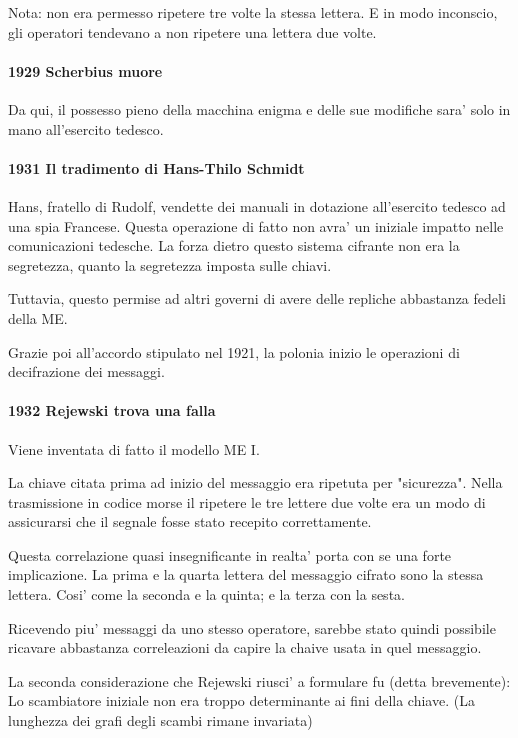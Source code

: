 Nota: non era permesso ripetere tre volte la stessa lettera.
E in modo inconscio, gli operatori tendevano a non ripetere una lettera due volte.

\paragraph{1929 Scherbius muore}
Da qui, il possesso pieno della macchina enigma e delle sue modifiche
sara' solo in mano all'esercito tedesco.

\paragraph{1931 Il tradimento di Hans-Thilo Schmidt}
Hans, fratello di Rudolf, vendette dei manuali in dotazione all'esercito
tedesco ad una spia Francese.
Questa operazione di fatto non avra' un iniziale impatto nelle comunicazioni tedesche.
La forza dietro questo sistema cifrante non era la segretezza, quanto la
segretezza imposta sulle chiavi.

Tuttavia, questo permise ad altri governi di avere delle repliche abbastanza
fedeli della ME.

Grazie poi all'accordo stipulato nel 1921, la polonia inizio le operazioni di
decifrazione dei messaggi.

\paragraph{1932 Rejewski trova una falla}
Viene inventata di fatto il modello ME I.

La chiave citata prima ad inizio del messaggio era ripetuta per "sicurezza".
Nella trasmissione in codice morse il ripetere le tre lettere due volte era
un modo di assicurarsi che il segnale fosse stato recepito correttamente.

Questa correlazione quasi insegnificante in realta' porta con se una forte
implicazione.
La prima e la quarta lettera del messaggio cifrato sono la stessa lettera.
Cosi' come la seconda e la quinta; e la terza con la sesta.

Ricevendo piu' messaggi da uno stesso operatore, sarebbe stato quindi possibile
ricavare abbastanza correleazioni da capire la chaive usata in quel messaggio.

La seconda considerazione che Rejewski riusci' a formulare fu (detta brevemente):
Lo scambiatore iniziale non era troppo determinante ai fini della chiave.
(La lunghezza dei grafi degli scambi rimane invariata)

